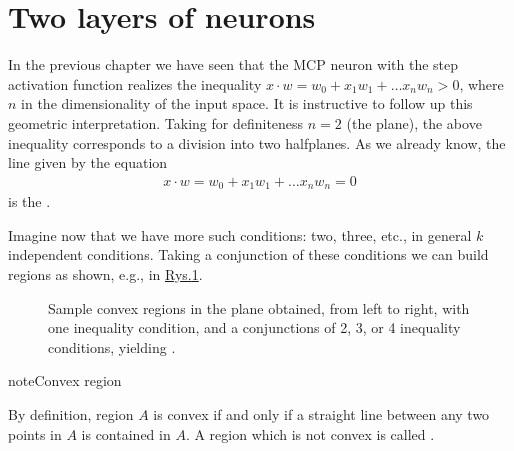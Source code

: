 \documentclass[a4paper,12pt,polish]{jupyterBook}
\let\sphinxpxdimen\pdfpxdimen\else\newdimen\sphinxpxdimen
\begin{document}
\section{Two layers of neurons}
\label{\detokenize{docs/more_layers:two-layers-of-neurons}}
\sphinxAtStartPar
In the previous chapter we have seen that the MCP neuron with the step activation function realizes the inequality \(x \cdot w=w_0+x_1 w_1 + \dots x_n w_n > 0\), where \(n\) in the dimensionality of the input space. It is instructive to follow up this geometric interpretation. Taking for definiteness \(n=2\) (the plane), the above inequality corresponds to a division into two half\sphinxhyphen{}planes. As we already know, the line given by the equation
\begin{equation*}
\begin{split}x \cdot w=w_0+x_1 w_1 + \dots x_n w_n = 0\end{split}
\end{equation*}
\sphinxAtStartPar
is the .

\sphinxAtStartPar
Imagine now that we have more such conditions: two, three, etc., in general \(k\) independent conditions. Taking a conjunction of these conditions we can build regions as shown, e.g., in \hyperref[\detokenize{docs/more_layers:regions-fig}]{Rys.\@ \ref{\detokenize{docs/more_layers:regions-fig}}}.

\begin{figure}[htbp]
\centering
\capstart

\noindent\sphinxincludegraphics[width=620\sphinxpxdimen]{{regions}.png}
\caption{Sample convex regions in the plane obtained, from left to right, with one inequality condition, and a conjunctions of 2, 3, or 4 inequality conditions, yielding .}\label{\detokenize{docs/more_layers:regions-fig}}\end{figure}

\begin{sphinxadmonition}{note}{Convex region}

\sphinxAtStartPar
By definition, region \(A\) is convex if and only if a straight line between any two points in \(A\) is contained in \(A\). A region which is not convex is called .
\end{sphinxadmonition}
\end{document}
